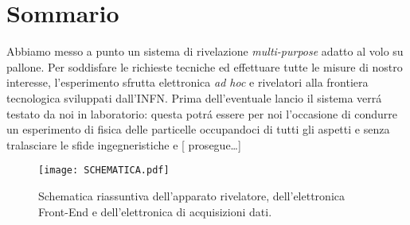 \section{Sommario}

Abbiamo messo a punto un sistema di rivelazione \emph{multi-purpose} adatto al volo su pallone. Per soddisfare le richieste tecniche ed effettuare tutte le misure di nostro interesse, l'esperimento sfrutta elettronica \emph{ad hoc} e rivelatori alla frontiera tecnologica sviluppati dall'INFN. Prima dell'eventuale lancio il sistema verr\'a testato da noi in laboratorio: questa potr\'a essere per noi l'occasione di condurre un esperimento di fisica delle particelle occupandoci di tutti gli aspetti e senza tralasciare le sfide ingegneristiche e [ prosegue\dots ]  

\begin{figure}[h]
\centering
\texttt{[image: SCHEMATICA.pdf]}
\caption{Schematica riassuntiva dell'apparato rivelatore, dell'elettronica Front-End e dell'elettronica di acquisizioni dati.}
\label{schematica}
\end{figure}
